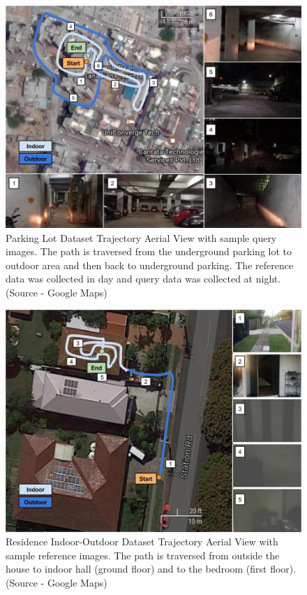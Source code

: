 \documentclass[letterpaper, 10 pt, conference]{ieeeconf}  %
\begin{document}
\begin{figure}[h]
\centering
 \includegraphics[scale=0.23]{Parking_Amrapali-Map-Images}
 \caption{Parking Lot Dataset Trajectory Aerial View with sample query images. The path is traversed from the underground parking lot to outdoor area and then back to underground parking. The reference data was collected in day and query data was collected at night. (Source - Google Maps)}
 \label{fig:parkingTraj}
\end{figure}

\begin{figure}[h]
\centering
 \includegraphics[scale=0.23]{Residence-IO-Map-Images}
 \caption{Residence Indoor-Outdoor Dataset Trajectory Aerial View with sample reference images. The path is traversed from outside the house to indoor  hall (ground floor) and to the bedroom (first floor). (Source - Google Maps)}
 \label{fig:homeTraj}
\end{figure}
\end{document}
